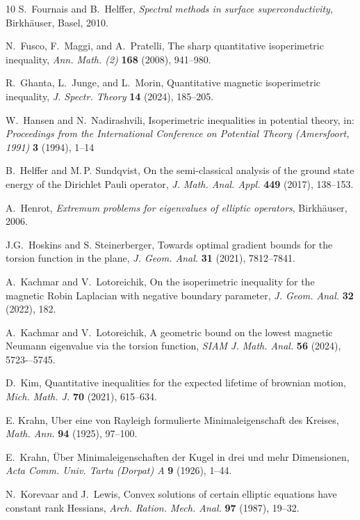 \documentclass[11pt,a4paper]{amsart}
\numberwithin{figure}{section}
\numberwithin{equation}{section}
\theoremstyle{plain}%
\theoremstyle{remark}
\theoremstyle{plain}
\begin{document}
\begin{thebibliography}{10}
	 S.~Fournais and B.~Helffer,  {\it Spectral methods in surface superconductivity},
	Birkh\"{a}user, Basel, 2010.
	
	N.~Fusco, F.~Maggi, and A.~Pratelli,
	The sharp quantitative isoperimetric inequality,
	{\em Ann. Math. (2)}  {\bf 168} (2008),
	941--980.
	
	R.~Ghanta, L.~Junge, and L.~Morin,
	Quantitative magnetic isoperimetric inequality,
	{\em J. Spectr. Theory}  {\bf 14} (2024), 185--205.
	
	W.~Hansen and N.~Nadirashvili,
	Isoperimetric inequalities in potential theory,
	in: {\em Proceedings from the {I}nternational {C}onference on
		{P}otential {T}heory ({A}mersfoort, 1991)} {\bf 3}  (1994), 1--14
	
	B.~Helffer and M.\,P. Sundqvist,
	On the semi-classical analysis of the ground state energy of the Dirichlet Pauli operator,
	{\it J. Math. Anal. Appl.} {\bf 449} (2017),  138--153.
	
	A.~Henrot, {\it
	Extremum problems for eigenvalues of elliptic operators},  Birkh\"{a}user, 2006.
	
	J.G.~Hoskins and S. Steinerberger, Towards optimal gradient bounds for the torsion function in the plane, {\it J. Geom. Anal.} {\bf 31} (2021), 7812--7841.
	
	A.~Kachmar and V.~Lotoreichik,
	On the isoperimetric inequality for the magnetic Robin Laplacian with negative boundary parameter,
	{\it J. Geom. Anal.} {\bf 32} (2022), 182.
	
	A.~Kachmar and V.~Lotoreichik,
	A geometric bound on the lowest magnetic Neumann eigenvalue via the torsion function,
	{\it SIAM J. Math. Anal.} {\bf 56} (2024), 5723-–5745.
	
	D.~Kim, Quantitative inequalities for the expected lifetime of brownian motion, {\it Mich. Math. J.} {\bf 70} (2021),
	 615--634.
	
	 E. Krahn, Uber eine von Rayleigh formulierte Minimaleigenschaft des Kreises, {\it Math. Ann.} {\bf 94} (1925), 97--100.
	
	E.~Krahn, 
	\"{U}ber Minimaleigenschaften der Kugel in drei und mehr Dimensionen, 
	{\it Acta Comm. Univ. Tartu (Dorpat) A} {\bf 9} (1926),  1--44.
	
	N.~Korevaar and J.~Lewis, Convex solutions of certain elliptic equations have constant rank Hessians,
	{\it Arch. Ration. Mech. Anal.} {\bf 97} (1987), 19--32.
	

\end{thebibliography}
\end{document}
